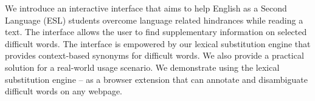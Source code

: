 We introduce an interactive interface that aims to help English as a Second Language (ESL) students overcome language related hindrances while reading a text. The interface allows the user to find supplementary information on selected difficult words. The interface is empowered by our lexical substitution engine that provides context-based synonyms for difficult words. We also provide a practical solution for a real-world usage scenario. We demonstrate using the lexical substitution engine -- as a browser extension that can annotate and disambiguate difficult words on any webpage.
